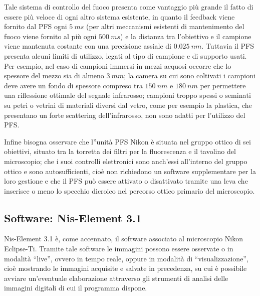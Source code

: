 Tale sistema di controllo del fuoco presenta come vantaggio più grande il fatto di essere più veloce di ogni altro sistema esistente, in quanto il feedback viene fornito dal PFS ogni $5\ ms$ (per altri meccanismi esistenti di mantenimento del fuoco viene fornito al più ogni $500\ ms$) e la distanza tra l'obiettivo e il campione viene mantenuta costante con una precisione assiale di $0.025\ nm$. 
Tuttavia il PFS presenta alcuni limiti di utilizzo, legati al tipo di campione e di supporto usati. 
Per esempio, nel caso di campioni immersi in mezzi acquosi occorre che lo spessore del mezzo sia di almeno $3\ mm$; la camera su cui sono coltivati i campioni deve avere un fondo di spessore compreso tra $150\ nm$ e $180\ nm$ per permettere una riflessione ottimale del segnale infrarosso; campioni troppo spessi o seminati su petri o vetrini di materiali diversi dal vetro, come per esempio la plastica, che presentano un forte scattering dell'infrarosso, non sono adatti per l'utilizzo del PFS. 

Infine bisogna osservare che l''unità PFS Nikon è situata nel gruppo ottico di sei obiettivi, situato tra la torretta dei filtri per la fluorescenza e il tavolino del microscopio; che i suoi controlli elettronici sono anch'essi all'interno del gruppo ottico e sono autosufficienti, cioè non richiedono un software supplementare per la loro gestione e che il PFS può essere attivato o disattivato tramite una leva che inserisce o meno lo specchio dicroico nel percorso ottico primario del microscopio.


\subsection{Software: Nis-Element 3.1}\label{NisElements}

Nis-Element 3.1 è, come accennato, il software associato al microscopio Nikon Eclipse-Ti.
Tramite tale software le immagini possono essere osservate o in modalità ``live'', ovvero in tempo reale, oppure in modalità di ``visualizzazione'', cioè mostrando le immagini acquisite e salvate in precedenza, su cui è possibile avviare un'eventuale elaborazione attraverso gli strumenti di analisi delle immagini digitali di cui il programma dispone.

